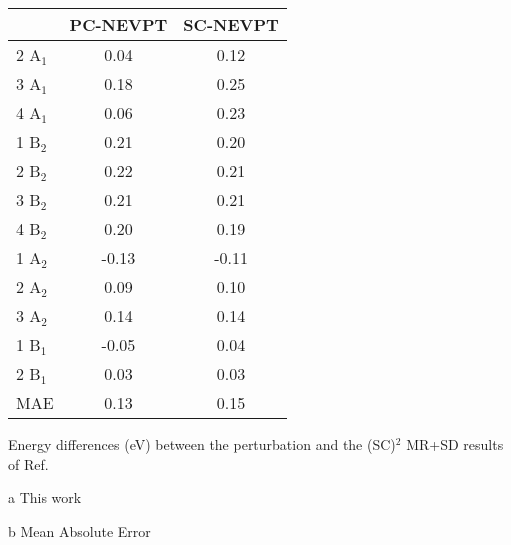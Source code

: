 \begin{center}
\begin{threeparttable}
\footnotesize
\begin{tabular*}{0.80\textwidth}{lcc}
\hline
         & PC-NEVPT \tnote{a} &  SC-NEVPT \tnote{a}   \\
\hline
2 A$_1$  &   0.04   &    0.12     \\
3 A$_1$  &   0.18   &    0.25     \\
4 A$_1$  &   0.06   &    0.23     \\
1 B$_2$  &   0.21   &    0.20     \\
2 B$_2$  &   0.22   &    0.21     \\
3 B$_2$  &   0.21   &    0.21     \\
4 B$_2$  &   0.20   &    0.19     \\
1 A$_2$  &  -0.13   &   -0.11     \\
2 A$_2$  &   0.09   &    0.10     \\
3 A$_2$  &   0.14   &    0.14     \\
1 B$_1$  &  -0.05   &    0.04     \\
2 B$_1$  &   0.03   &    0.03     \\
\hline
MAE\tnote{b}   &   0.13   &    0.15    \\
\hline
\end{tabular*}
\caption{\footnotesize Energy differences (eV) between the perturbation and the (SC)$^2$ MR+SD results 
of Ref. 
}
\label{tbl:form_comparison2}
\begin{tablenotes}
\footnotesize
\item[a] This work
\item[b] Mean Absolute Error
\end{tablenotes}
\end{threeparttable}
\end{center}
